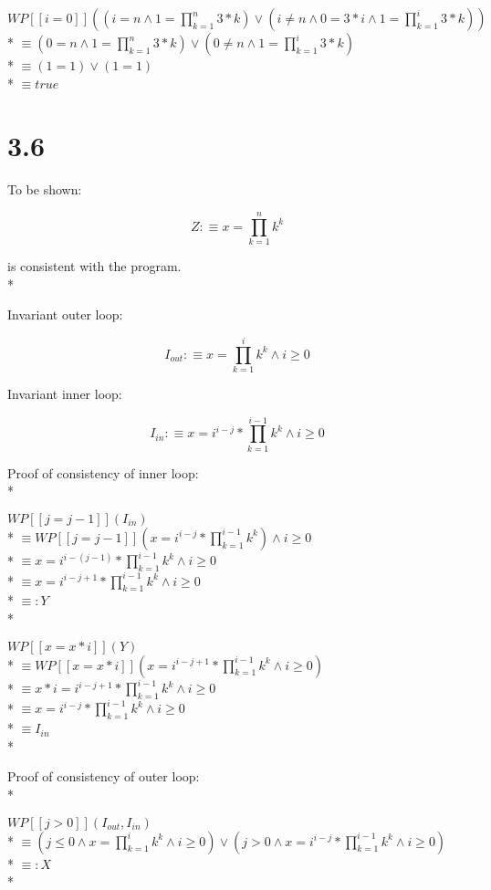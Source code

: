 \documentclass{article}
\begin{document}
$ WP[\![i=0]\!]((i=n \land 1=\prod_{k=1}^{n} 3*k) \lor (i \ne n \land 0=3*i \land 1=\prod_{k=1}^{i}3*k)) $ \\*
$ \equiv (0=n \land 1=\prod_{k=1}^{n} 3*k) \lor (0 \ne n \land 1=\prod_{k=1}^{i}3*k) $ \\*
$ \equiv (1=1) \lor (1=1) $ \\*
$ \equiv true $

\section*{3.6}

To be shown:

$$ Z:\equiv x=\prod_{k=1}^{n} k^k $$

is consistent with the program. \\*

Invariant outer loop:

$$ I_{out}:\equiv x=\prod_{k=1}^{i} k^k \land i \ge 0 $$

Invariant inner loop:

$$ I_{in}:\equiv x=i^{i-j}*\prod_{k=1}^{i-1} k^k \land i \ge 0 $$

Proof of consistency of inner loop: \\*

$ WP[\![j=j-1]\!](I_{in}) $ \\*
$ \equiv WP[\![j=j-1]\!](x=i^{i-j}*\prod_{k=1}^{i-1} k^k) \land i \ge 0 $ \\*
$ \equiv x=i^{i-(j-1)}*\prod_{k=1}^{i-1} k^k \land i \ge 0 $ \\*
$ \equiv x=i^{i-j+1}*\prod_{k=1}^{i-1} k^k \land i \ge 0 $ \\*
$ \equiv: Y $ \\*

$ WP[\![x=x*i]\!](Y) $ \\*
$ \equiv WP[\![x=x*i]\!](x=i^{i-j+1}*\prod_{k=1}^{i-1} k^k \land i \ge 0) $ \\*
$ \equiv x*i=i^{i-j+1}*\prod_{k=1}^{i-1} k^k \land i \ge 0 $ \\*
$ \equiv x=i^{i-j}*\prod_{k=1}^{i-1} k^k \land i \ge 0 $ \\*
$ \equiv I_{in} $ \\*

Proof of consistency of outer loop: \\*

$ WP[\![j>0]\!](I_{out}, I_{in}) $ \\*
$ \equiv (j\le 0 \land x=\prod_{k=1}^{i} k^k \land i \ge 0) \lor (j>0 \land x=i^{i-j}*\prod_{k=1}^{i-1} k^k \land i \ge 0) $ \\*
$ \equiv: X $ \\*
\end{document}
